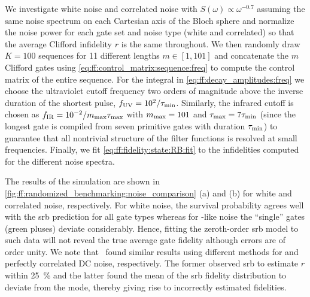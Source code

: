 We investigate white noise and correlated noise with $S(\omega)\propto\omega^{-0.7}$ assuming the same noise spectrum on each Cartesian axis of the Bloch sphere and normalize the noise power for each gate set and noise type (white and correlated) so that the average Clifford infidelity $r$ is the same throughout.
We then randomly draw $K = \num{100}$ sequences for \num{11} different lengths $m\in[1, 101]$ and concatenate the $m$ Clifford gates using \cref{eq:ff:control_matrix:sequence:freq} to compute the control matrix of the entire sequence.
For the integral in \cref{eq:ff:decay_amplitudes:freq} we choose the ultraviolet cutoff frequency two orders of magnitude above the inverse duration of the shortest pulse, $f_{\mathrm{UV}} = 10^2/\tau_{\mathrm{min}}$.
Similarly, the infrared cutoff is chosen as $f_{\mathrm{IR}} = 10^{-2}/m_{\mathrm{max}}\tau_{\mathrm{max}}$ with $m_{\mathrm{max}} = 101$ and $\tau_{\mathrm{max}} = 7\tau_{\mathrm{min}}$ (since the longest gate is compiled from seven primitive gates with duration $\tau_{\mathrm{min}}$) to guarantee that all nontrivial structure of the filter functions is resolved at small frequencies.
Finally, we fit \cref{eq:ff:fidelity:state:RB:fit} to the infidelities computed for the different noise spectra.

The results of the simulation are shown in \cref{fig:ff:randomized_benchmarking:noise_comparison} (a) and (b) for white and correlated noise, respectively.
For white noise, the survival probability agrees well with the \gls{srb} prediction for all gate types whereas for \oneoverf-like noise the \enquote{single} gates (green pluses) deviate considerably.
Hence, fitting the zeroth-order \gls{srb} model to such data will not reveal the true average gate fidelity although errors are of order unity.
We note that~ found similar results using different methods for \oneoverf and perfectly correlated DC noise, respectively.
The former observed \gls{srb} to estimate $r$ within \qty{25}{\percent} and the latter found the mean of the \gls{srb} fidelity distribution to deviate from the mode, thereby giving rise to incorrectly estimated fidelities.

